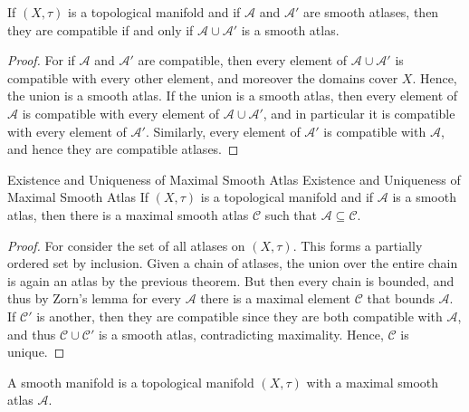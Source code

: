 \documentclass{article}                                                        %
\begin{document}
        \begin{theorem}
            If $(X,\tau)$ is a topological manifold and if $\mathcal{A}$ and
            $\mathcal{A}'$ are smooth atlases, then they are compatible if and
            only if $\mathcal{A}\cup\mathcal{A}'$ is a smooth atlas.
        \end{theorem}
        \begin{proof}
            For if $\mathcal{A}$ and $\mathcal{A}'$ are compatible, then
            every element of $\mathcal{A}\cup\mathcal{A}'$ is compatible with
            every other element, and moreover the domains cover $X$. Hence,
            the union is a smooth atlas. If the union is a smooth atlas, then
            every element of $\mathcal{A}$ is compatible with every element of
            $\mathcal{A}\cup\mathcal{A}'$, and in particular it is compatible
            with every element of $\mathcal{A}'$. Similarly, every element of
            $\mathcal{A}'$ is compatible with $\mathcal{A}$, and hence they are
            compatible atlases.
        \end{proof}
        \begin{ltheorem}{Existence and Uniqueness of Maximal Smooth Atlas}
                        {Existence and Uniqueness of Maximal Smooth Atlas}
            If $(X,\tau)$ is a topological manifold and if $\mathcal{A}$ is a
            smooth atlas, then there is a maximal smooth atlas $\mathcal{C}$
            such that $\mathcal{A}\subseteq\mathcal{C}$.
        \end{ltheorem}
        \begin{proof}
            For consider the set of all atlases on $(X,\tau)$. This forms a
            partially ordered set by inclusion. Given a chain of atlases,
            the union over the entire chain is again an atlas by the previous
            theorem. But then every chain is bounded, and thus by Zorn's lemma
            for every $\mathcal{A}$ there is a maximal element $\mathcal{C}$
            that bounds $\mathcal{A}$. If $\mathcal{C}'$ is another, then
            they are compatible since they are both compatible with
            $\mathcal{A}$, and thus $\mathcal{C}\cup\mathcal{C}'$ is a smooth
            atlas, contradicting maximality. Hence, $\mathcal{C}$ is unique.
        \end{proof}
        \begin{definition}
            A smooth manifold is a topological manifold $(X,\tau)$ with a
            maximal smooth atlas $\mathcal{A}$.
        \end{definition}
\end{document}
